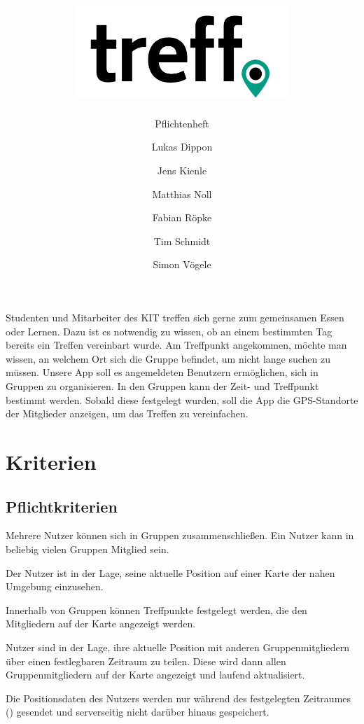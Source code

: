 \documentclass[parskip=full,11pt]{scrartcl}
\title{\includegraphics[width = 80mm]{images/logo_crop.png}}
\subtitle{\huge Pflichtenheft}
\author{Lukas Dippon
        \and Jens Kienle
        \and Matthias Noll
        \and Fabian Röpke
        \and Tim Schmidt
        \and Simon Vögele}
\begin{document}
\maketitle
\thispagestyle{empty} %

\section*{} %
Studenten und Mitarbeiter des KIT treffen sich gerne zum gemeinsamen Essen oder Lernen.
Dazu ist es notwendig zu wissen, ob an einem bestimmten Tag bereits ein Treffen vereinbart wurde.
Am Treffpunkt angekommen, möchte man wissen, an welchem Ort sich die Gruppe befindet, um nicht lange suchen zu müssen.
Unsere App soll es angemeldeten Benutzern ermöglichen, sich in Gruppen zu organisieren.
In den Gruppen kann der Zeit- und Treffpunkt bestimmt werden.
Sobald diese festgelegt wurden, soll die App die GPS-Standorte der Mitglieder anzeigen, um das Treffen zu vereinfachen.

\pagebreak
\tableofcontents

\pagebreak
\section{Kriterien}

\subsection{Pflichtkriterien}
Mehrere Nutzer können sich in Gruppen zusammenschließen.
Ein Nutzer kann in beliebig vielen Gruppen Mitglied sein.

Der Nutzer ist in der Lage, seine aktuelle Position auf einer Karte der nahen
Umgebung einzusehen.

Innerhalb von Gruppen können Treffpunkte festgelegt werden,
die den Mitgliedern auf der Karte angezeigt werden.

Nutzer sind in der Lage, ihre aktuelle Position mit anderen Gruppenmitgliedern
über einen festlegbaren Zeitraum zu teilen.
Diese wird dann allen Gruppenmitgliedern auf der Karte angezeigt und laufend
aktualisiert.

Die Positionsdaten des Nutzers werden nur während des festgelegten Zeitraumes
() gesendet und serverseitig nicht darüber hinaus
gespeichert.
\end{document}
